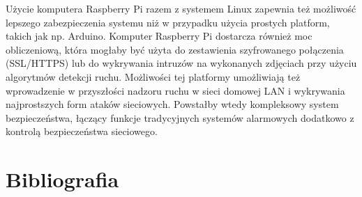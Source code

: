 \documentclass[a4paper,11pt,twoside]{article}
\begin{document}
Użycie komputera Raspberry Pi razem z systemem Linux zapewnia też możliwość lepszego zabezpieczenia systemu niż w przypadku użycia prostych platform, takich jak np. Arduino. Komputer Raspberry Pi dostarcza również moc obliczeniową, która mogłaby być użyta do zestawienia szyfrowanego połączenia (SSL/HTTPS) lub do wykrywania intruzów na wykonanych zdjęciach przy użyciu algorytmów detekcji ruchu. Możliwości tej platformy umożliwiają też wprowadzenie w przyszłości nadzoru ruchu w sieci domowej LAN i wykrywania najprostszych form ataków sieciowych. Powstałby wtedy kompleksowy system bezpieczeństwa, łączący funkcje tradycyjnych systemów alarmowych dodatkowo z kontrolą bezpieczeństwa sieciowego.



  

\newpage
\section{Bibliografia}
\end{document}
